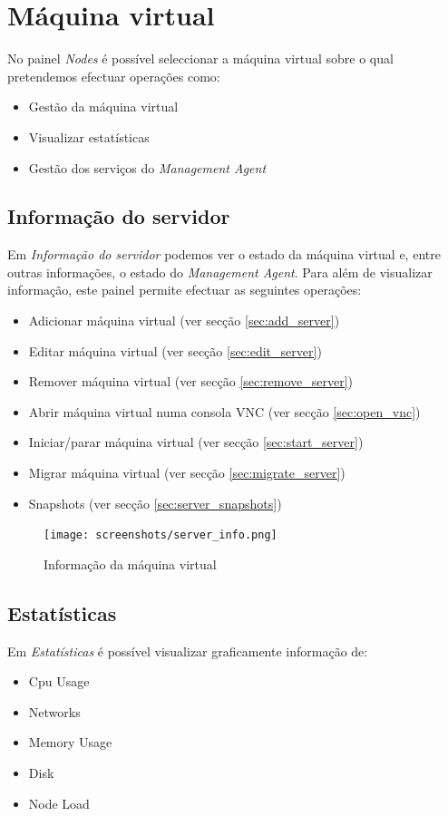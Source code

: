 \pagebreak

\section{Máquina virtual}
\label{sec:server}

No painel \emph{Nodes} é possível seleccionar a máquina virtual sobre o qual pretendemos efectuar operações como:

\begin{itemize}
        \item Gestão da máquina virtual
        \item Visualizar estatísticas        
        \item Gestão dos serviços do \emph{Management Agent}
\end{itemize}

\subsection{Informação do servidor}
Em \emph{Informação do servidor} podemos ver o estado da máquina virtual e, entre outras informações, o estado do \emph{Management Agent}.
Para além de visualizar informação, este painel permite efectuar as seguintes operações:
\begin{itemize}
	\item Adicionar máquina virtual (ver secção \ref{sec:add_server})
    \item Editar máquina virtual (ver secção \ref{sec:edit_server})
	\item Remover máquina virtual (ver secção \ref{sec:remove_server})
	\item Abrir máquina virtual numa consola VNC (ver secção \ref{sec:open_vnc})
	\item Iniciar/parar máquina virtual (ver secção \ref{sec:start_server})
    \item Migrar máquina virtual (ver secção \ref{sec:migrate_server})
    \item Snapshots (ver secção \ref{sec:server_snapshots})
\end{itemize}

\begin{figure}[H]
	\begin{center}
	\texttt{[image: screenshots/server\_info.png]}
	\caption{Informação da máquina virtual}
	\label{fig:server_info}
	\end{center}
\end{figure}

\subsection{Estatísticas}
Em \emph{Estatísticas} é possível visualizar graficamente informação de:
\begin{itemize}
	\item Cpu Usage
	\item Networks
	\item Memory Usage
	\item Disk
	\item Node Load
\end{itemize}

